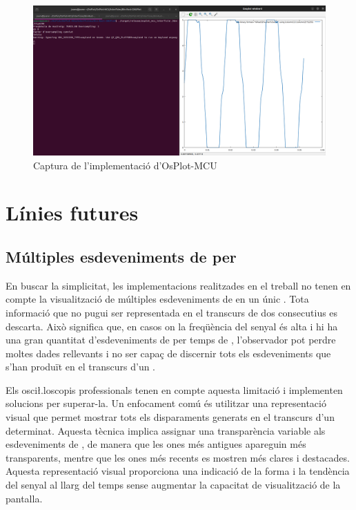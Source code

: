 \documentclass{tfgitic}[2023/07/07]
\begin{document}
\begin{figure}[h]
  \centering \includegraphics[width=\textwidth]{imgs/OsPlot-MCU.png}
  \caption{Captura de l'implementació d'OsPlot-MCU}
\end{figure}

\chapter{Línies futures}

\section{Múltiples esdeveniments de  per }

En buscar la simplicitat, les implementacions realitzades en el
treball no tenen en compte la visualització de múltiples esdeveniments
de  en un únic . Tota informació que no pugui
ser representada en el transcurs de dos  consecutius es
descarta. Això significa que, en casos on la freqüència del senyal és
alta i hi ha una gran quantitat d'esdeveniments de  per
temps de , l'observador pot perdre moltes dades rellevants
i no ser capaç de discernir tots els esdeveniments que s'han produït
en el transcurs d'un .

Els osci\l.loscopis professionals tenen en compte aquesta limitació i
implementen solucions per superar-la. Un enfocament comú és utilitzar
una representació visual que permet mostrar tots els disparaments
generats en el transcurs d'un  determinat. Aquesta tècnica
implica assignar una transparència variable als esdeveniments de
, de manera que les ones més antigues apareguin més
transparents, mentre que les ones més recents es mostren més clares i
destacades. Aquesta representació visual proporciona una indicació de
la forma i la tendència del senyal al llarg del temps sense augmentar
la capacitat de visualització de la pantalla.
\end{document}
